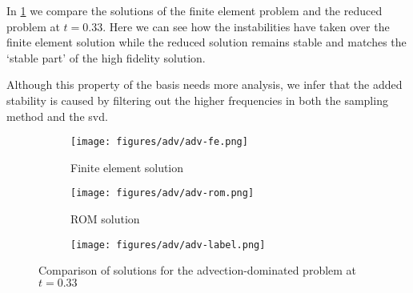 In \cref{fig:adv-comparison} we compare the solutions of the finite element problem and the reduced problem at $t=0.33$. Here we can see how the instabilities have taken over the finite element solution while the reduced solution remains stable and matches the `stable part' of the high fidelity solution.

Although this property of the basis needs more analysis, we infer that the added stability is caused by filtering out the higher frequencies in both the sampling method and the \gls{svd}.
\begin{figure}[H]
	\centering
	\begin{subfigure}[htb!]{0.44\textwidth}
	    \centering
	    \texttt{[image: figures/adv/adv-fe.png]}
	    \caption{Finite element solution}
    \end{subfigure}
    \begin{subfigure}[htb!]{0.44\textwidth}
	    \centering
	    \texttt{[image: figures/adv/adv-rom.png]}
	    \caption{ROM solution}
    \end{subfigure}
    \begin{subfigure}[htb!]{0.1\textwidth}
	    \centering
	    \texttt{[image: figures/adv/adv-label.png]}
    \end{subfigure}
	\caption{Comparison of solutions for the advection-dominated problem at $t=0.33$} 
	\label{fig:adv-comparison}
\end{figure}
